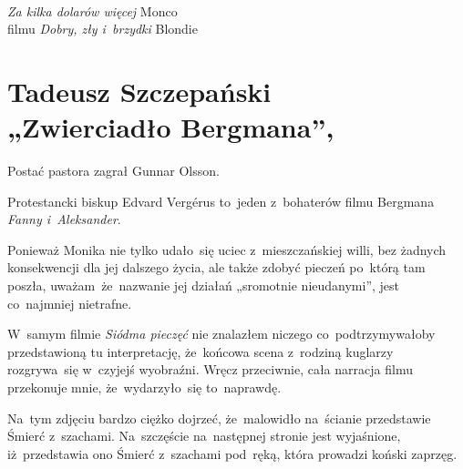 \documentclass[a4paper,11pt]{article}
\numberwithin{equation}{section}
\begin{document}
\VerSpaceTwo


\noindent
{} \\
\Jest \textit{Za kilka dolarów więcej} Monco \\
\PowinnoByc filmu \textit{Dobry, zły i~brzydki} Blondie \\













\section{ %
  Tadeusz Szczepański \\
  „Zwierciadło Bergmana”, \cite{SzczepanskiZwierciadloBergmana2007} }




 Postać pastora zagrał Gunnar Olsson.

\VerSpaceFour





 Protestancki biskup Edvard Verg\'{e}rus
to~jeden z~bohaterów filmu Bergmana \textit{Fanny i~Aleksander}.

\VerSpaceFour





 Ponieważ Monika nie tylko udało~się uciec
z~mieszczańskiej willi, bez żadnych konsekwencji dla jej dalszego
życia, ale także zdobyć pieczeń po~którą tam poszła,
uważam~że~nazwanie jej działań „sromotnie nieudanymi”, jest
co~najmniej nietrafne.

\VerSpaceFour





 W~samym filmie \textit{Siódma pieczęć} nie znalazłem
niczego co~podtrzymywałoby przedstawioną tu interpretację, że~końcowa
scena z~rodziną kuglarzy rozgrywa~się w~czyjejś wyobraźni. Wręcz
przeciwnie, cała narracja filmu przekonuje mnie, że~wydarzyło~się
to~naprawdę.

\VerSpaceFour





 Na~tym zdjęciu bardzo ciężko dojrzeć, że~malowidło
na~ścianie przedstawie Śmierć z~szachami. Na~szczęście na~następnej
stronie jest wyjaśnione, iż~przedstawia ono Śmierć z~szachami
pod~ręką, która prowadzi koński zaprzęg.
\end{document}

